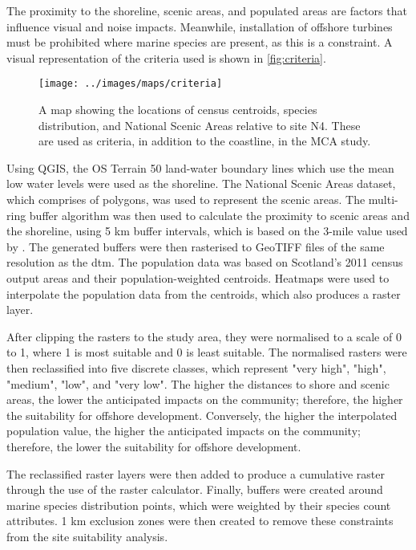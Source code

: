 The proximity to the shoreline, scenic areas, and populated areas are factors that influence visual and noise impacts. Meanwhile, installation of offshore turbines must be prohibited where marine species are present, as this is a constraint. A visual representation of the criteria used is shown in \autoref{fig:criteria}.

\begin{figure}
  \centering
  \texttt{[image: ../images/maps/criteria]}
  \caption{A map showing the locations of census centroids, species distribution, and National Scenic Areas relative to site N4. These are used as criteria, in addition to the coastline, in the MCA study. \label{fig:criteria}}
\end{figure}

Using QGIS, the OS Terrain 50 land-water boundary lines which use the mean low water levels were used as the shoreline. The National Scenic Areas dataset, which comprises of polygons, was used to represent the scenic areas. The multi-ring buffer algorithm was then used to calculate the proximity to scenic areas and the shoreline, using 5 km buffer intervals, which is based on the 3-mile value used by \textcite{mekonnen2015}. The generated buffers were then rasterised to GeoTIFF files of the same resolution as the \gls{dtm}. The population data was based on Scotland's 2011 census output areas and their population-weighted centroids. Heatmaps were used to interpolate the population data from the centroids, which also produces a raster layer.

After clipping the rasters to the study area, they were normalised to a scale of 0 to 1, where 1 is most suitable and 0 is least suitable. The normalised rasters were then reclassified into five discrete classes, which represent "very high", "high", "medium", "low", and "very low". The higher the distances to shore and scenic areas, the lower the anticipated impacts on the community; therefore, the higher the suitability for offshore development. Conversely, the higher the interpolated population value, the higher the anticipated impacts on the community; therefore, the lower the suitability for offshore development.

The reclassified raster layers were then added to produce a cumulative raster through the use of the raster calculator. Finally, buffers were created around marine species distribution points, which were weighted by their species count attributes. 1 km exclusion zones were then created to remove these constraints from the site suitability analysis.

